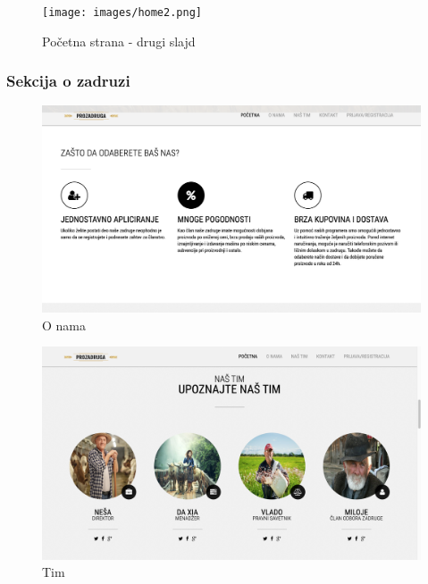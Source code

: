 \documentclass[a4paper, oneside]{article}
\begin{document}
\begin{figure}[h!]
    \centering
    \texttt{[image: images/home2.png]}
    \caption{Početna strana - drugi slajd}
    \label{homepage2}
\end{figure}

\newpage
\subsubsection{Sekcija o zadruzi}
\begin{figure}[h!]
    \centering
    \includegraphics[scale=0.3]{images/about.png}
    \caption{O nama}
    \label{about}
\end{figure}

\begin{figure}[h!]
    \centering
    \includegraphics[scale=0.3]{images/team.png}
    \caption{Tim}
    \label{team}
\end{figure}

\newpage
\end{document}

